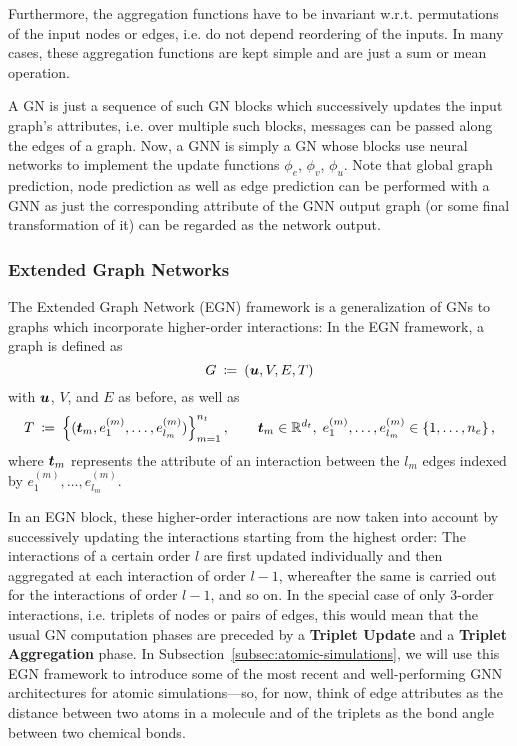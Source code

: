

Furthermore, the aggregation functions have to be invariant w.r.t. permutations of the
input nodes or edges, i.e. do not depend reordering of the inputs. In many cases,
these aggregation functions are kept simple and are just a sum or mean operation.

A GN is just a sequence of such GN blocks which successively updates the input graph's
attributes, i.e. over multiple such blocks, messages can be passed along the edges of
a graph. Now, a GNN is simply a GN whose blocks use neural networks to implement the
update functions $\phi_e$, $\phi_v$, $\phi_u$. Note that global graph prediction, 
node prediction as well as edge prediction can be performed with a GNN as just
the corresponding attribute of the GNN output graph (or some final transformation of it) can 
be regarded as the network output.

\subsubsection{Extended Graph Networks}
\label{subsubsec:egns}

The Extended Graph Network (EGN) framework \cite[Section 2.1]{https://doi.org/10.48550/arxiv.2203.09697}
 is a generalization of GNs to graphs which 
incorporate higher-order interactions: In the EGN framework, a graph is defined as
\[ G \: \coloneqq \: (\boldsymbol{u}, V, E, T) \]
with $\boldsymbol{u}$, $V$, and $E$ as before, as well as
\begin{equation} 
    T \: \coloneqq \: \left\{(\boldsymbol{t}_m, e_1^{(m)}, \dots, e_{l_m}^{(m)})\right\}_{m=1}^{n_t}, 
    \qquad \boldsymbol{t}_m \in \mathbb{R}^{d_t}, \; 
    e_1^{(m)}, \dots, e_{l_m}^{(m)} \in \left\{1, \dots, n_e\right\} \text{,} 
    \label{eq:higher_order_interact}
\end{equation}
where $\boldsymbol{t}_m$ represents the attribute of an interaction between the $l_m$ edges indexed 
by $e_1^{(m)}, \dots, e_{l_m}^{(m)}$. 

In an EGN block, these higher-order interactions are now taken into account by 
successively updating the interactions starting from the highest order: The interactions
of a certain order $l$ are first updated individually and then aggregated at each
interaction of order $l-1$, whereafter the same is carried out for the interactions
of order $l-1$, and so on. In the special case of only $3$-order interactions, i.e.
triplets of nodes or pairs of edges, this would mean that the usual GN computation 
phases are preceded by a \textbf{Triplet Update} and a \textbf{Triplet Aggregation}
phase. In Subsection~\ref{subsec:atomic-simulations}, we will use this EGN framework
to introduce some of the most recent and well-performing GNN architectures for atomic 
simulations---so, for now, think of edge attributes as the distance between two
atoms in a molecule and of the triplets as the bond angle between two chemical bonds.